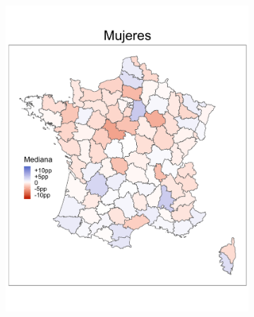 \begin{figure}
\begin{subfigure}{0.275\textwidth}
	\includegraphics[width = \textwidth]{Figs/Efectos/Mapa_Efectos_Muj_Modelo_H}
	\end{subfigure}
	~
	\begin{subfigure}{0.275\textwidth}

\end{subfigure}
\end{figure}
